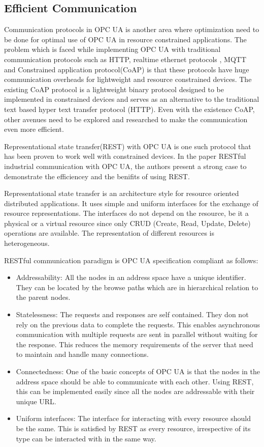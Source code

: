 \documentclass[conference]{IEEEtran}
\begin{document}
\subsection{Efficient Communication}
Communication protocols in OPC UA is another area where optimization need to be done for optimal use of OPC UA in resource constrained applications. The problem which is faced while implementing OPC UA with traditional communication protocols such as HTTP, realtime ethernet protocols , MQTT and Constrained application protocol(CoAP) is that these protocols have huge communication overheads for lightweight and resource constrained devices. 
The existing CoAP protocol is a lightweight binary protocol designed to be implemented in constrained devices and serves as an alternative to the traditional text based hyper text transfer protocol (HTTP). Even with the existence CoAP, other avenues need to be explored and researched to make the communication even more efficient.

Representational state transfer(REST) with OPC UA is one such protocol that has been proven to work well with constrained devices. In the paper RESTful industrial communication with OPC UA, the authors present a strong case to demonstrate the efficiencey and the benifits of using REST.\cite{gruner2016restful}

Representational state transfer is an architecture style for resource oriented distributed applications.\cite{gruner2016restful}
It uses simple and uniform interfaces for the exchange of resource representations. The interfaces do not depend on the resource, be it a physical or a virtual resource since only CRUD (Create, Read, Update, Delete) operations are available. The representation of different resources is heterogeneous.

RESTful communication paradigm is OPC UA specification compliant as follows\cite{gruner2016restful}:

\begin{itemize}
\item Addressability: All the nodes in an address space have a unique identifier. They can be located by the browse paths which are in hierarchical relation to the parent nodes.

\item Statelessness: The requests and responses are self contained. They don not rely on the previous data to complete the requests. This enables asynchronous communication with multiple requests are sent in parallel without waiting for the response. This reduces the memory requirements of the server that need to maintain and handle many connections.

\item Connectedness: One of the basic concepts of OPC UA is that the nodes in the address space should be able to communicate with each other. Using REST, this can be implemented easily since all the nodes are addressable with their unique URL.

\item Uniform interfaces: The interface for interacting with every resource should be the same. This  
is satisfied by REST as every resource, irrespective of its type can be interacted with in the same way.
\end{itemize}
\end{document}
